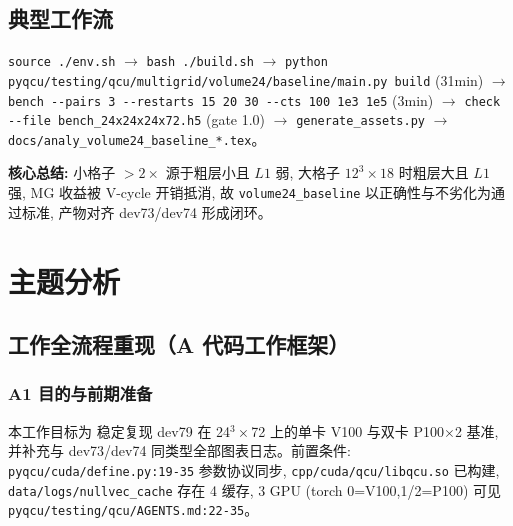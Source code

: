 \documentclass[UTF8]{ctexart}
\begin{document}
\subsection{典型工作流}
\texttt{\nolinkurl{source ./env.sh}} $\to$ \texttt{\nolinkurl{bash ./build.sh}} $\to$ \texttt{\nolinkurl{python pyqcu/testing/qcu/multigrid/volume24/baseline/main.py build}} (31min) $\to$ \texttt{\nolinkurl{bench --pairs 3 --restarts 15 20 30 --cts 100 1e3 1e5}} (3min) $\to$ \texttt{\nolinkurl{check --file bench_24x24x24x72.h5}} (gate 1.0) $\to$ \texttt{\nolinkurl{generate_assets.py}} $\to$ \texttt{\nolinkurl{docs/analy_volume24_baseline_*.tex}}。

\begin{ideabox}
\textbf{核心总结:} 小格子 $>2\times$ 源于粗层小且 $L1$ 弱, 大格子 $12^3\times18$ 时粗层大且 $L1$ 强, MG 收益被 V-cycle 开销抵消, 故 \texttt{\nolinkurl{volume24_baseline}} 以正确性与不劣化为通过标准, 产物对齐 dev73/dev74 形成闭环。
\end{ideabox}

\section{主题分析}
\subsection{工作全流程重现（A 代码工作框架）}

\subsubsection{A1 目的与前期准备}
本工作目标为 \textcolor{struct}{稳定复现 dev79 在 24$^3\times$72 上的单卡 V100 与双卡 P100$\times$2 基准, 并补充与 dev73/dev74 同类型全部图表日志}。前置条件: \texttt{\nolinkurl{pyqcu/cuda/define.py:19-35}} 参数协议同步, \texttt{\nolinkurl{cpp/cuda/qcu/libqcu.so}} 已构建, \texttt{\nolinkurl{data/logs/nullvec_cache}} 存在 4 缓存, 3 GPU (torch 0=V100,1/2=P100) 可见 \textcolor{evidence}{\texttt{\nolinkurl{pyqcu/testing/qcu/AGENTS.md:22-35}}}。
\end{document}
